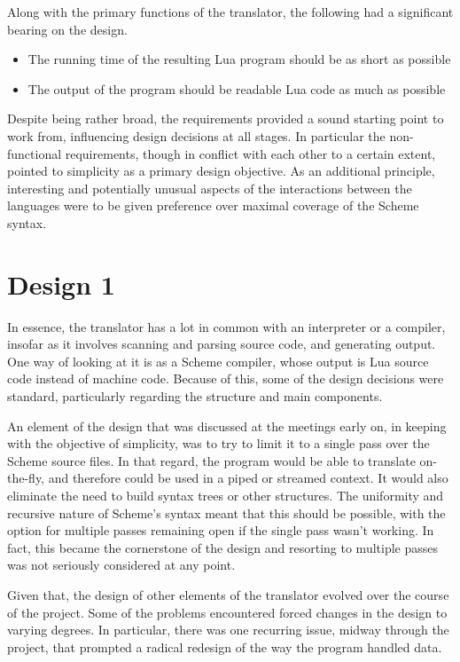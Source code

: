 Along with the primary functions of the translator, the following had a
significant bearing on the design.
\begin{itemize}
\item The running time of the resulting Lua program should be as short as
possible
\item The output of the program should be readable Lua code as much as possible
\end{itemize}

Despite being rather broad, the requirements provided a sound starting point to
work from, influencing design decisions at all stages. In particular the
non-functional requirements, though in conflict with each other to a certain
extent, pointed to simplicity as a primary design objective. As an additional
principle, interesting and potentially unusual aspects of the interactions
between the languages were to be given preference over maximal coverage of the
Scheme syntax.


\section{Design 1}

In essence, the translator has a lot in common with an interpreter or a
compiler, insofar as it involves scanning and parsing source code, and
generating output. One way of looking at it is as a Scheme compiler, whose
output is Lua source code instead of machine code. Because of this, some of the
design decisions were standard, particularly regarding the structure and main
components.

An element of the design that was discussed at the meetings early on, in keeping
with the objective of simplicity, was to try to limit it to a single pass over
the Scheme source files. In that regard, the program would be able to translate
on-the-fly, and therefore could be used in a piped or streamed context. It would
also eliminate the need to build syntax trees or other structures. The
uniformity and recursive nature of Scheme's syntax meant that this should be
possible, with the option for multiple passes remaining open if the single pass
wasn't working. In fact, this became the cornerstone of the design and resorting
to multiple passes was not seriously considered at any point.

Given that, the design of other elements of the translator evolved over the
course of the project. Some of the problems encountered forced changes in the
design to varying degrees. In particular, there was one recurring issue, midway
through the project, that prompted a radical redesign of the way the program
handled data.

